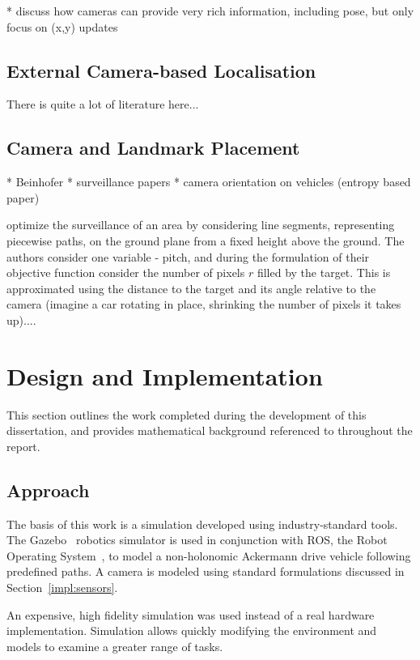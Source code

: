 \documentclass[a4paper,12pt,twoside,openright]{report}
\begin{document}
* discuss how cameras can provide very rich information, including pose, but only focus on (x,y) updates

\section{External Camera-based Localisation}

There is quite a lot of literature here...

\section{Camera and Landmark Placement}

* Beinhofer
* surveillance papers
* camera orientation on vehicles (entropy based paper)

\citeauthor{bodor2007optimal} optimize the surveillance of an area by considering
line segments, representing piecewise paths, on the ground plane from a fixed
height above the ground. The authors consider one variable - pitch,
and during the formulation of their
objective function consider the number of pixels $r$ filled by the target.
This is approximated using the distance to the target and its angle relative 
to the camera (imagine a car rotating in place, shrinking the number
of pixels it takes up).... 

\chapter{Design and Implementation}
\label{chap:impl}

This section outlines the work completed during the development
of this dissertation, and provides mathematical background
referenced to throughout the report.

\section{Approach}

The basis of this work is a simulation developed using industry-standard tools.
The Gazebo~\cite{koenig2004design} robotics simulator is used in conjunction with ROS,
the Robot Operating System~\cite{quigley2009ros}, to model a non-holonomic Ackermann drive vehicle
following predefined paths. A camera is modeled using standard formulations
discussed in Section~\ref{impl:sensors}.

An expensive, high fidelity simulation was used instead of a real hardware
implementation. Simulation allows quickly modifying the environment
and models to examine a greater range of tasks.
\end{document}
